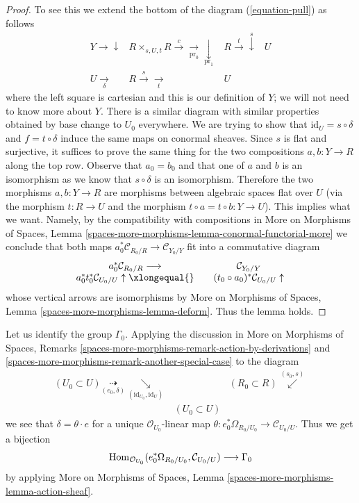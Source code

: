 \begin{proof}
To see this we extend the bottom of the diagram (\ref{equation-pull})
as follows
$$
\begin{array}{cccc}Y \longrightarrow\downarrow & R \times_{s, U, t} R
\overset{c}{\longrightarrow}\underset{\text{pr}_0}{\longrightarrow}\underset{\text{pr}_1}{\downarrow} & R \overset{t}{\longrightarrow}\overset{s}{\downarrow} & U \\ U \underset{\delta}{\longrightarrow} & R \overset{s}{\longrightarrow}\underset{t}{\longrightarrow} & U & \end{array}
$$
where the left square is cartesian and this is our definition
of $Y$; we will not need to know more about $Y$.
There is a similar diagram with similar properties obtained by
base change to $U_0$ everywhere.
We are trying to show that $\text{id}_U = s \circ \delta$
and $f = t \circ \delta$ induce the same maps on conormal sheaves.
Since $s$ is flat and surjective, it suffices to prove the same
thing for the two compositions $a, b : Y \to R$ along the top row.
Observe that $a_0 = b_0$ and that one of $a$ and $b$ is an isomorphism
as we know that $s \circ \delta$ is an isomorphism. Therefore
the two morphisms $a, b : Y \to R$ are morphisms between
algebraic spaces flat over $U$ (via the morphism $t : R \to U$
and the morphism $t \circ a = t \circ b : Y \to U$).
This implies what we want. Namely, by the compatibility with compositions in
More on Morphisms of Spaces, Lemma
\ref{spaces-more-morphisms-lemma-conormal-functorial-more}
we conclude that both maps
$a_0^*\mathcal{C}_{R_0/R} \to \mathcal{C}_{Y_0/Y}$
fit into a commutative diagram
$$
\begin{array}{ccc}a_0^*\mathcal{C}_{R_0/R} \longrightarrow &  & \mathcal{C}_{Y_0/Y} \\ a_0^*t_0^*\mathcal{C}_{U_0/U} \uparrow\xlongequal{} &  & (t_0 \circ a_0)^*\mathcal{C}_{U_0/U} \uparrow\end{array}
$$
whose vertical arrows are isomorphisms by
More on Morphisms of Spaces, Lemma
\ref{spaces-more-morphisms-lemma-deform}.
Thus the lemma holds.
\end{proof}

Let us identify the group $\Gamma_0$.
Applying the discussion in More on Morphisms of Spaces, Remarks
\ref{spaces-more-morphisms-remark-action-by-derivations} and
\ref{spaces-more-morphisms-remark-another-special-case}
to the diagram
$$
\begin{array}{ccc}(U_0 \subset U) \underset{(e_0, \delta)}{\dashrightarrow}\underset{(\text{id}_{U_0}, \text{id}_U)}{\searrow} &  & (R_0 \subset R) \overset{(s_0, s)}{\swarrow} \\  & (U_0 \subset U) & \end{array}
$$
we see that $\delta = \theta \cdot e$ for a unique
$\mathcal{O}_{U_0}$-linear map
$\theta : e_0^*\Omega_{R_0/U_0} \to \mathcal{C}_{U_0/U}$.
Thus we get a bijection
\begin{equation}
\label{equation-isomorphism}
\operatorname{Hom}_{\mathcal{O}_{U_0}}(e_0^*\Omega_{R_0/U_0}, \mathcal{C}_{U_0/U})
\longrightarrow
\Gamma_0
\end{equation}
by applying More on Morphisms of Spaces, Lemma
\ref{spaces-more-morphisms-lemma-action-sheaf}.

